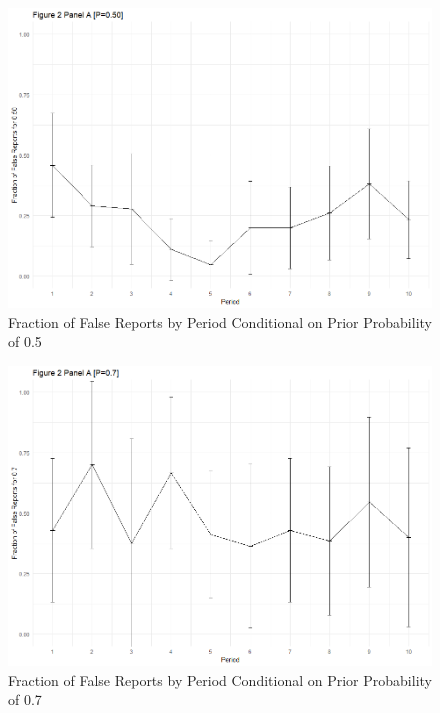 \documentclass[12pt,a4paper]{article}
\begin{document}
	\begin{figure}
		\centering
		\includegraphics[scale=0.4]{../../results/2a_50.png}
		\caption{Fraction of False Reports by Period Conditional on Prior Probability of 0.5} \label{tab:F4}
		\label{fig:enter-label}
	\end{figure}
	
	\begin{figure}
		\centering
		\includegraphics[scale=0.4]{../../results/2a_70.png}
		\caption{Fraction of False Reports by Period Conditional on Prior Probability of 0.7} \label{tab:F5}
		\label{fig:enter-label}
	\end{figure}
	
\end{document}
